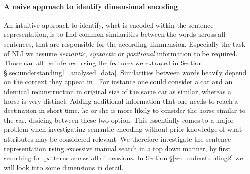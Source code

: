 \paragraph*{A naive approach to identify dimensional encoding}
An intuitive approach to identify, what is encoded within the sentence representation, is to find common similarities between the words across all sentences, that are responsible for the according dimmension. Especially the task of \ac{NLI} we assume \textit{semantic}, \textit{syntactic} or \textit{positional} information to be required. Those can all be inferred using the features we extraced in Section §\ref{sec:understanding1_analysed_data}. Similarities between words heavily depend on the context they appear in \citep{dagan2000contextual}. For instance one could consider a car and an identical recunstruction in original size of the same car as similar, whereas a horse is very distinct. Adding additional information that one needs to reach a destination in short time, he or she is more likely to consider the horse similar to the car, desicing between these two option. This essentially comes to a major problem when investigating semantic encoding without prior knowledge of what attributes may be considered relevant. We therefore investigate the sentence representation using excessive manual search in a top down manner, by first searching for patterns across all dimensions. In Section §\ref{sec:understanding2} we will look into some dimensions in detail.

